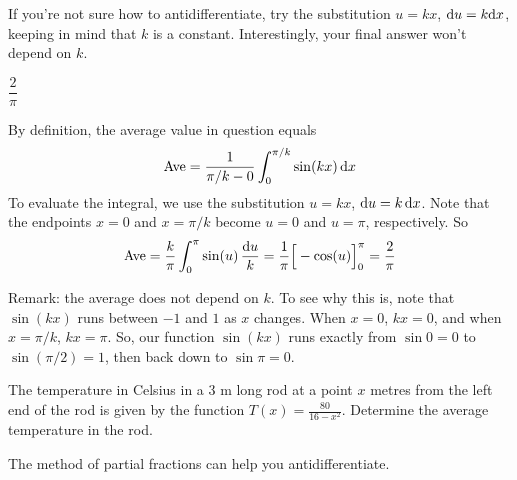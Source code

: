 \begin{hint}
If you're not sure how to antidifferentiate, try the substitution $u=kx$, $\mathrm{d}u=k\mathrm{d}x$, keeping in mind that $k$ is a constant. Interestingly, your final answer won't depend on $k$.
\end{hint}

\begin{answer}
 $\dfrac{2}{\pi}$
\end{answer}

\begin{solution}
By definition, the average value in question equals
\begin{equation*}
\text{Ave}=\frac1{\pi/k-0} \int_0^{\pi/k} \sin(kx) \,\mathrm{d}x
\end{equation*}
To evaluate the integral, we use the substitution $u = kx$,
$\mathrm{d}u=k\,\mathrm{d}x$.
Note that the endpoints
$x=0$ and $x=\pi/k$ become $u=0$ and $u=\pi$, respectively. So
\begin{align*}
\text{Ave}=\frac{k}{\pi} \int_0^\pi \sin(u) \,\frac{\mathrm{d}u}{k}
=\frac{1}{\pi}\Big[-\cos(u)\Big]_0^\pi
=\frac{2}{\pi}
\end{align*}

Remark: the average does not depend on $k$. To see why this is, note that $\sin(kx)$ runs between $-1$ and $1$ as $x$ changes. When $x=0$, $kx=0$, and when $x=\pi/k$, $kx=\pi$. So, our function $\sin (kx)$ runs exactly from $\sin  0 =0$ to $\sin(\pi/2)=1$, then back down to $\sin\pi=0$.

\begin{center}
\end{center}
\end{solution}



\begin{Mquestion}[1997A]
 The temperature in Celsius in a 3 m long rod at a point $x$ metres from the left end of the rod is given by the
function $T(x)=\frac{80}{16-x^2}$. Determine the average temperature in the rod.
\end{Mquestion}

\begin{hint}
The method of partial fractions can help you antidifferentiate.
\end{hint}

